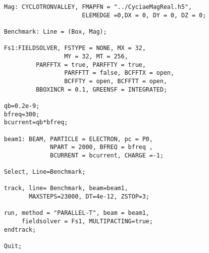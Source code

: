 \documentclass[a4paper,11pt]{article}
\begin{document}
\begin{verbatim}
Mag: CYCLOTRONVALLEY, FMAPFN = "../CyciaeMagReal.h5", 
                      ELEMEDGE =0,DX = 0, DY = 0, DZ = 0;

Benchmark: Line = (Box, Mag);

Fs1:FIELDSOLVER, FSTYPE = NONE, MX = 32, 
                 MY = 32, MT = 256,
		 PARFFTX = true, PARFFTY = true, 
                 PARFFTT = false, BCFFTX = open, 
                 BCFFTY = open, BCFFTT = open,
		 BBOXINCR = 0.1, GREENSF = INTEGRATED;
		 
qb=0.2e-9;
bfreq=300;
bcurrent=qb*bfreq;

beam1: BEAM, PARTICLE = ELECTRON, pc = P0, 
             NPART = 2000, BFREQ = bfreq , 
             BCURRENT = bcurrent, CHARGE =-1;

Select, Line=Benchmark;

track, line= Benchmark, beam=beam1, 
       MAXSTEPS=23000, DT=4e-12, ZSTOP=3;  

run, method = "PARALLEL-T", beam = beam1, 
     fieldsolver = Fs1, MULTIPACTING=true;
endtrack;

Quit;

\end{verbatim}
\end{document}
